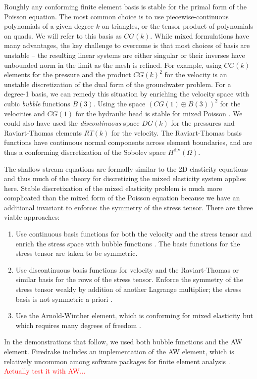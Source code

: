 \documentclass{article}
\theoremstyle{definition}
\theoremstyle{plain}
\begin{document}
Roughly any conforming finite element basis is stable for the primal form of the Poisson equation.
The most common choice is to use piecewise-continuous polynomials of a given degree $k$ on triangles, or the tensor product of polynomials on quads.
We will refer to this basis as $CG(k)$.
While mixed formulations have many advantages, the key challenge to overcome is that most choices of basis are unstable -- the resulting linear systems are either singular or their inverses have unbounded norm in the limit as the mesh is refined.
For example, using $CG(k)$ elements for the pressure and the product $CG(k)^2$ for the velocity is an unstable discretization of the dual form of the groundwater problem.
For a degree-1 basis, we can remedy this situation by enriching the velocity space with cubic \emph{bubble} functions $B(3)$.
Using the space $(CG(1) \oplus B(3))^2$ for the velocities and $CG(1)$ for the hydraulic head is stable for mixed Poisson \citep{boffi2013mixed}.
We could also have used the \emph{discontinuous} space $DG(k)$ for the pressures and Raviart-Thomas elements $RT(k)$ for the velocity.
The Raviart-Thomas basis functions have continuous normal components across element boundaries, and are thus a conforming discretization of the Sobolev space $H^{\text{div}}(\Omega)$.

The shallow stream equations are formally similar to the 2D elasticity equations and thus much of the theory for discretizing the mixed elasticity system applies here.
Stable discretization of the mixed elasticity problem is much more complicated than the mixed form of the Poisson equation because we have an additional invariant to enforce: the symmetry of the stress tensor.
There are three viable approaches:
\begin{enumerate}
    \item Use continuous basis functions for both the velocity and the stress tensor and enrich the stress space with bubble functions \citep{brezzi1993mixed}.
        The basis functions for the stress tensor are taken to be symmetric.
    \item Use discontinuous basis functions for velocity and the Raviart-Thomas or similar basis for the rows of the stress tensor.
        Enforce the symmetry of the stress tensor weakly by addition of another Lagrange multiplier; the stress basis is not symmetric a priori \citep{arnold1984peers}.
    \item Use the Arnold-Winther element, which is conforming for mixed elasticity but which requires many degrees of freedom \citep{arnold2002mixed}.
\end{enumerate}
In the demonstrations that follow, we used both bubble functions and the AW element.
Firedrake includes an implementation of the AW element, which is relatively uncommon among software packages for finite element analysis \citep{aznaran2021transformations}.
\textcolor{red}{Actually test it with AW...}
\end{document}
